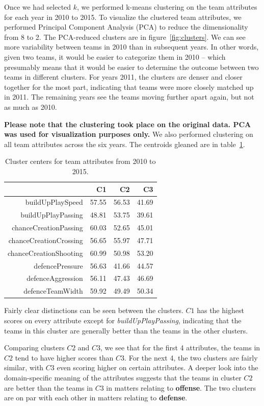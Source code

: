 \documentclass[11pt]{article}
\begin{document}
Once we had selected $k$, we performed k-means clustering on the team attributes for each year in 2010 to 2015.
To visualize the clustered team attributes, we performed Principal Component Analysis (PCA) to reduce the dimensionality from 8 to 2.
The PCA-reduced clusters are in figure~\ref{fig:clusters}.
We can see more variability between teams in 2010 than in subsequent years.
In other words, given two teams, it would be easier to categorize them in 2010 -- which presumably means that it would be easier to determine the outcome between two teams in different clusters.
For years 2011, the clusters are denser and closer together for the most part, indicating that teams were more closely matched up in 2011.
The remaining years see the teams moving further apart again, but not as much as 2010.

\textbf{Please note that the clustering took place on the original data.
PCA was used for visualization purposes only.}
We also performed clustering on all team attributes across the six years.
The centroids gleaned are in table~\ref{tab:centroids}.

\begin{table}[ht!]
\centering
\begin{tabular}{rrrr}
  \hline
 & C1 & C2 & C3 \\
  \hline
buildUpPlaySpeed & 57.55 & 56.53 & 41.69 \\
  buildUpPlayPassing & 48.81 & 53.75 & 39.61 \\
  chanceCreationPassing & 60.03 & 52.65 & 45.01 \\
  chanceCreationCrossing & 56.65 & 55.97 & 47.71 \\
  chanceCreationShooting & 60.99 & 50.98 & 53.20 \\
  defencePressure & 56.63 & 41.66 & 44.57 \\
  defenceAggression & 56.11 & 47.43 & 46.69 \\
  defenceTeamWidth & 59.92 & 49.49 & 50.34 \\
   \hline
\end{tabular}
\caption{Cluster centers for team attributes from 2010 to 2015.}
\label{tab:centroids}
\end{table}

Fairly clear distinctions can be seen between the clusters.
$C1$ has the highest scores on every attribute except for \textit{buildUpPlayPassing}, indicating that the teams in this cluster are generally better than the teams in the other clusters.

Comparing clusters $C2$ and $C3$, we see that for the first 4 attributes, the teams in $C2$ tend to have higher scores than $C3$.
For the next 4, the two clusters are fairly similar, with $C3$ even scoring higher on certain attributes.
A deeper look into the domain-specific meaning of the attributes suggests that the teams in cluster $C2$ are better than the teams in $C3$ in matters relating to \textbf{offense}.
The two clusters are on par with each other in matters relating to \textbf{defense}.
\end{document}
